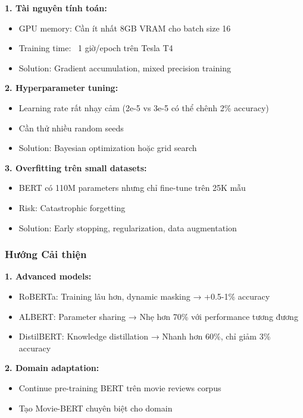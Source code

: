 \textbf{1. Tài nguyên tính toán:}
\begin{itemize}
    \item GPU memory: Cần ít nhất 8GB VRAM cho batch size 16
    \item Training time: ~1 giờ/epoch trên Tesla T4
    \item Solution: Gradient accumulation, mixed precision training
\end{itemize}

\textbf{2. Hyperparameter tuning:}
\begin{itemize}
    \item Learning rate rất nhạy cảm (2e-5 vs 3e-5 có thể chênh 2\% accuracy)
    \item Cần thử nhiều random seeds
    \item Solution: Bayesian optimization hoặc grid search
\end{itemize}

\textbf{3. Overfitting trên small datasets:}
\begin{itemize}
    \item BERT có 110M parameters nhưng chỉ fine-tune trên 25K mẫu
    \item Risk: Catastrophic forgetting
    \item Solution: Early stopping, regularization, data augmentation
\end{itemize}

\subsubsection{Hướng Cải thiện}

\textbf{1. Advanced models:}
\begin{itemize}
    \item RoBERTa: Training lâu hơn, dynamic masking → +0.5-1\% accuracy
    \item ALBERT: Parameter sharing → Nhẹ hơn 70\% với performance tương đương
    \item DistilBERT: Knowledge distillation → Nhanh hơn 60\%, chỉ giảm 3\% accuracy
\end{itemize}

\textbf{2. Domain adaptation:}
\begin{itemize}
    \item Continue pre-training BERT trên movie reviews corpus
    \item Tạo Movie-BERT chuyên biệt cho domain
\end{itemize}

